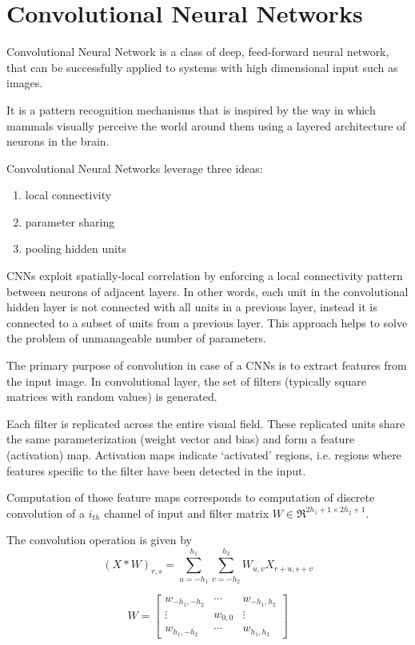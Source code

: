 \chapter{Convolutional Neural Networks}
Convolutional Neural Network is a class of deep, feed-forward neural network, that can be successfully applied to systems with high dimensional input such as images.

It is a pattern recognition mechanisms that is inspired by the way in which mammals visually perceive the world around them using a layered architecture of neurons in the brain. 

Convolutional Neural Networks leverage three ideas:
\begin{enumerate}
\itemsep0em 
\item local connectivity
\item parameter sharing
\item pooling hidden units
\end{enumerate}

CNNs exploit spatially-local correlation by enforcing a local connectivity pattern between neurons of adjacent layers. In other words, each unit in the convolutional hidden layer is not connected with all units in a previous layer, instead it is connected to a subset of units from a previous layer. This approach helps to solve the problem of unmanageable number of parameters. 


The primary purpose of convolution in case of a CNNs is to extract features from the input image. In convolutional layer, the set of filters (typically square matrices with random values) is generated. 

Each filter is replicated across the entire visual field. These replicated units share the same parameterization (weight vector and bias) and form a feature (activation) map. Activation maps indicate ‘activated’ regions, i.e. regions where features specific to the filter have been detected in the input. 

Computation of those feature maps corresponds to computation of discrete convolution of a $i_{th}$ channel of input and filter matrix $W \in \Re^{2h_{1}+1 \times 2h_{2}+1}$. 

The convolution operation is given by
\begin{equation}
(X \ast W)_{r,s} = \sum_{u=-h_{1}}^{h_{1}}\sum_{v=-h_{2}}^{h_{2}} W_{u,v}X_{r+u,s+v}
\end{equation}

\begin{equation}
W =
\left[
\begin{matrix}
w_{-h_{1},-h_{2}} & \cdots & w_{-h_{1},h_{2}}  \\
\vdots & w_{0,0}& \vdots\\
w_{h_{1},-h_{2}} & \cdots & w_{h_{1},h_{2}} 
\end{matrix}
\right]
\end{equation}

